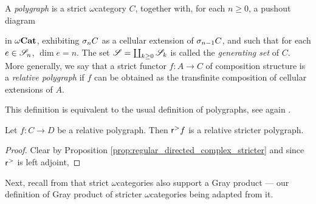 \begin{dfn} [Polygraph]
    A \emph{polygraph} is a strict \( \omega \)\nbd category \( C \), together with, for each \( n \geq 0 \), a pushout diagram
    \begin{center}
    \end{center}
    in \( {\omega\mathbf{Cat}} \), exhibiting \( \sigma_{n}C \) as a cellular extension of \( \sigma_{n - 1}C \), and such that for each \( e \in \mathscr{S}_n \), \( \dim e = n \).
    The set \( \mathscr{S} = \coprod_{k \geq 0} \mathscr{S}_k \) is called the \emph{generating set} of \( C \).
    More generally, we say that a strict functor \( f \colon A \to C \) of composition structure is a \emph{relative polygraph} if \( f \) can be obtained as the transfinite composition of cellular extensions of \( A \).
\end{dfn}

\begin{rmk}
    This definition is equivalent to the usual definition of polygraphs, see again \cite[Comment 8.2.2]{hadzihasanovic2024combinatorics}.
\end{rmk}

\begin{lem} \label{lem:reflection_of_polygraphs_are_stricter_polygraphs}
    Let \( f \colon C \to D \) be a relative polygraph.
    Then \( \mathsf{r}^{>} f \) is a relative stricter polygraph.
\end{lem}
\begin{proof}
    Clear by Proposition \ref{prop:regular_directed_complex_stricter} and since \( \mathsf{r}^{>} \) is left adjoint, 
\end{proof}

\noindent Next, recall from \cite[Appendice A]{ara2020joint} that strict \( \omega \)\nbd categories also support a Gray product --- our definition of Gray product of stricter \( \omega \)\nbd categories being adapted from it.

